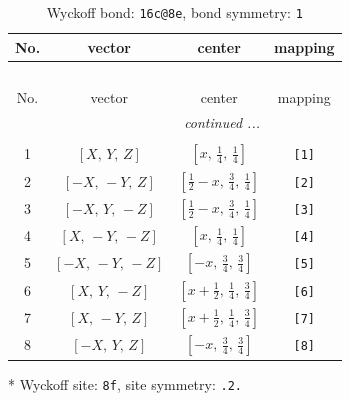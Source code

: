 \documentclass[fleqn,8pt]{jsarticle}
\begin{document}
\renewcommand{\arraystretch}{1.2}
\begin{longtable}{cccc}
\caption{Wyckoff bond: {\tt 16c@8e}, bond symmetry: {\tt 1}}
 \\
 \hline \hline
No. & vector & center & mapping \\ \hline \endfirsthead

\multicolumn{3}{l}{\tablename\ \thetable{}} \\
 \hline \hline
No. & vector & center & mapping \\ \hline \endhead

 \hline \hline
\multicolumn{3}{r}{\footnotesize\it continued ...} \\ \endfoot

 \hline \hline
\multicolumn{3}{r}{} \\ \endlastfoot

1 & $\left[ X,\, Y,\, Z \right]$ & $\left[ x,\, \frac{1}{4},\, \frac{1}{4} \right]$ & {\tt [1]} \\ \hline
2 & $\left[ - X,\, - Y,\, Z \right]$ & $\left[ \frac{1}{2} - x,\, \frac{3}{4},\, \frac{1}{4} \right]$ & {\tt [2]} \\ \hline
3 & $\left[ - X,\, Y,\, - Z \right]$ & $\left[ \frac{1}{2} - x,\, \frac{3}{4},\, \frac{1}{4} \right]$ & {\tt [3]} \\ \hline
4 & $\left[ X,\, - Y,\, - Z \right]$ & $\left[ x,\, \frac{1}{4},\, \frac{1}{4} \right]$ & {\tt [4]} \\ \hline
5 & $\left[ - X,\, - Y,\, - Z \right]$ & $\left[ - x,\, \frac{3}{4},\, \frac{3}{4} \right]$ & {\tt [5]} \\ \hline
6 & $\left[ X,\, Y,\, - Z \right]$ & $\left[ x + \frac{1}{2},\, \frac{1}{4},\, \frac{3}{4} \right]$ & {\tt [6]} \\ \hline
7 & $\left[ X,\, - Y,\, Z \right]$ & $\left[ x + \frac{1}{2},\, \frac{1}{4},\, \frac{3}{4} \right]$ & {\tt [7]} \\ \hline
8 & $\left[ - X,\, Y,\, Z \right]$ & $\left[ - x,\, \frac{3}{4},\, \frac{3}{4} \right]$ & {\tt [8]} \\
\end{longtable}
* Wyckoff site: {\tt 8f}, site symmetry: {\tt .2.}
\renewcommand{\arraystretch}{1.2}
\end{document}
